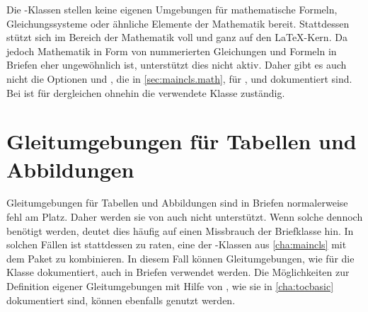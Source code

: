 Die \KOMAScript-Klassen stellen keine eigenen Umgebungen für mathematische
Formeln, Gleichungssysteme oder ähnliche Elemente der Mathematik
bereit. Stattdessen stützt sich \KOMAScript{} im Bereich der Mathematik voll
und ganz auf den \LaTeX-Kern. Da jedoch Mathematik in Form
von nummerierten Gleichungen und Formeln in Briefen eher ungewöhnlich ist,
unterstützt  dies nicht aktiv. Daher gibt es auch nicht die
Optionen  und ,
die in \autoref{sec:maincls.math},  für
,  und  dokumentiert
sind. Bei  ist für dergleichen ohnehin die verwendete
Klasse zuständig.%
\iffalse%
  \par
  Auf eine Beschreibung der Mathematikumgebungen des \LaTeX-Kerns, also
  \Environment{displaymath}\IndexEnv{displaymath},
  \Environment{equation}\IndexEnv{equation} und
  \Environment{eqnarray}\IndexEnv{eqnarray}, wird an dieser Stelle
  verzichtet. Wer diese verwenden möchte, sei auf \cite{l2kurz} verwiesen. Für
  mehr als nur einfachste mathematische Formeln und Gleichungen sei jedoch die
  Verwendung von \Package{amsmath}\IndexPackage{amsmath} empfohlen (siehe
  \cite{package:amsmath}).%
\fi
%
\EndIndexGroup


\section{Gleitumgebungen für Tabellen und Abbildungen}

Gleitumgebungen für Tabellen und Abbildungen sind in Briefen normalerweise
fehl am Platz. Daher werden sie von  auch
nicht unterstützt. Wenn solche dennoch benötigt werden, deutet dies häufig auf
einen Missbrauch der Briefklasse hin. In solchen Fällen ist stattdessen zu
raten, eine der \KOMAScript-Klassen aus \autoref{cha:maincls} mit dem Paket
 zu kombinieren. In diesem
Fall können Gleitumgebungen, wie für die Klasse dokumentiert, auch in Briefen
verwendet werden. Die Möglichkeiten zur Definition eigener Gleitumgebungen mit
Hilfe von \hyperref[cha:tocbasic]{}%
, wie sie in
\autoref{cha:tocbasic} dokumentiert sind, können ebenfalls genutzt werden.




